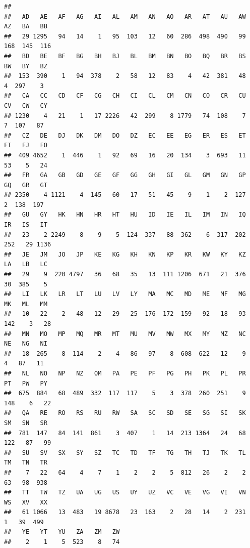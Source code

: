 \documentclass[
  12pt,
]{article}
\begin{document}
\begin{verbatim}
## 
##   AD   AE   AF   AG   AI   AL   AM   AN   AO   AR   AT   AU   AW   AZ   BA   BB 
##   29 1295   94   14    1   95  103   12   60  286  498  490   99  168  145  116 
##   BD   BE   BF   BG   BH   BJ   BL   BM   BN   BO   BQ   BR   BS   BW   BY   BZ 
##  153  390    1   94  378    2   58   12   83    4   42  381   48    4  297    3 
##   CA   CC   CD   CF   CG   CH   CI   CL   CM   CN   CO   CR   CU   CV   CW   CY 
## 1230    4   21    1   17 2226   42  299    8 1779   74  108    7    7  107   87 
##   CZ   DE   DJ   DK   DM   DO   DZ   EC   EE   EG   ER   ES   ET   FI   FJ   FO 
##  409 4652    1  446    1   92   69   16   20  134    3  693   11   53    5   24 
##   FR   GA   GB   GD   GE   GF   GG   GH   GI   GL   GM   GN   GP   GQ   GR   GT 
## 2350    4 1121    4  145   60   17   51   45    9    1    2  127    2  138  197 
##   GU   GY   HK   HN   HR   HT   HU   ID   IE   IL   IM   IN   IQ   IR   IS   IT 
##   23    2 2249    8    9    5  124  337   88  362    6  317  202  252   29 1136 
##   JE   JM   JO   JP   KE   KG   KH   KN   KP   KR   KW   KY   KZ   LA   LB   LC 
##   29    9  220 4797   36   68   35   13  111 1206  671   21  376   30  385    5 
##   LI   LK   LR   LT   LU   LV   LY   MA   MC   MD   ME   MF   MG   MK   ML   MM 
##   10   22    2   48   12   29   25  176  172  159   92   18   93  142    3   28 
##   MN   MO   MP   MQ   MR   MT   MU   MV   MW   MX   MY   MZ   NC   NE   NG   NI 
##   18  265    8  114    2    4   86   97    8  608  622   12    9    4   87   11 
##   NL   NO   NP   NZ   OM   PA   PE   PF   PG   PH   PK   PL   PR   PT   PW   PY 
##  675  884   68  489  332  117  117    5    3  378  260  251    9  148    6   22 
##   QA   RE   RO   RS   RU   RW   SA   SC   SD   SE   SG   SI   SK   SM   SN   SR 
##  781  147   84  141  861    3  407    1   14  213 1364   24   68  122   87   99 
##   SU   SV   SX   SY   SZ   TC   TD   TF   TG   TH   TJ   TK   TL   TM   TN   TR 
##    7   22   64    4    7    1    2    2    5  812   26    2    2   63   98  938 
##   TT   TW   TZ   UA   UG   US   UY   UZ   VC   VE   VG   VI   VN   WS   XV   XX 
##   61 1066   13  483   19 8678   23  163    2   28   14    2  231    1   39  499 
##   YE   YT   YU   ZA   ZM   ZW 
##    2    1    5  523    8   74
\end{verbatim}
\end{document}
